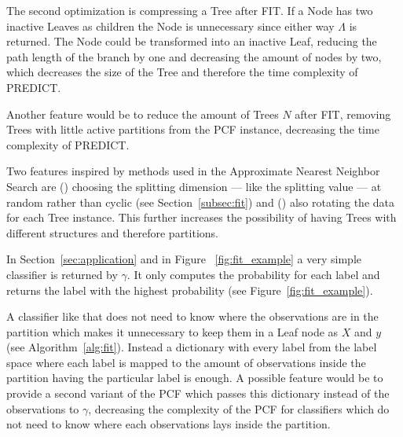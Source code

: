 The second optimization is compressing a Tree after FIT.
If a Node has two inactive Leaves as children the Node is
unnecessary since either way $\Lambda$ is returned. The
Node could be transformed into an inactive Leaf, reducing
the path length of the branch by one and decreasing the
amount of nodes by two, which decreases the size of the
Tree and therefore the time complexity of PREDICT.

Another feature would be to reduce the amount of Trees $N$
after FIT, removing Trees with little active partitions
from the PCF instance, decreasing the time complexity
of PREDICT.

Two features inspired by methods used in the Approximate
Nearest Neighbor Search are () choosing the
splitting dimension --- like the splitting value --- at
random rather than cyclic (see Section~\ref{subsec:fit})
and () also rotating the data for each Tree
instance.\cite[pages 17 - 27]{anns} This further increases
the possibility of having Trees with different structures
and therefore partitions.\cite[page 24]{anns}

In Section~\ref{sec:application} and in Figure~%
\ref{fig:fit_example} a very simple classifier is returned
by $\gamma$. It only computes the probability for each
label and returns the label with the highest probability
(see Figure~\ref{fig:fit_example}).

A classifier like that does not need to know where the
observations are in the partition which makes it
unnecessary to keep them in a Leaf node as $X$ and $y$
(see Algorithm~\ref{alg:fit}). Instead a dictionary with
every label from the label space where each label is mapped
to the amount of observations inside the partition having
the particular label is enough. A possible feature would be
to provide a second variant of the PCF which passes this
dictionary instead of the observations to $\gamma$,
decreasing the complexity of the PCF for classifiers which
do not need to know where each observations lays inside the
partition.

